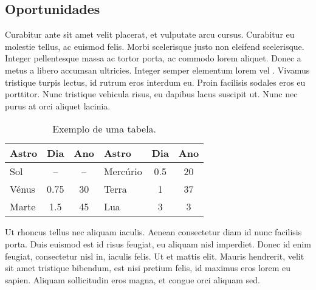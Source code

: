 \subsection{Oportunidades}

Curabitur  ante sit amet velit placerat, et vulputate arcu cursus. Curabitur eu molestie tellus, ac euismod felis. Morbi scelerisque justo non eleifend scelerisque. Integer pellentesque massa ac tortor porta, ac commodo lorem aliquet. Donec a metus a libero accumsan ultricies. Integer semper elementum lorem vel . Vivamus tristique turpis lectus, id rutrum eros interdum eu. Proin facilisis sodales eros eu porttitor. Nunc tristique vehicula risus, eu dapibus lacus suscipit ut. Nunc nec purus at orci aliquet lacinia.

\begin{table}
	\caption{Exemplo de uma tabela.}
	\begin{center}
		\begin{tabular}{lcc|lcc}
			\textbf{Astro} & \textbf{Dia} & \textbf{Ano} & \textbf{Astro} & \textbf{Dia} & \textbf{Ano}\\
			\hline
			Sol & -- & -- & Mercúrio  & 0.5 & 20 \\
			Vénus & 0.75 & 30 & Terra & 1 & 37 \\
			Marte & 1.5 & 45 & Lua & 3 & 3 
		\end{tabular}
	\end{center}
\end{table}

Ut rhoncus tellus nec aliquam iaculis. Aenean consectetur diam id nunc facilisis porta. Duis euismod est id risus feugiat, eu aliquam nisl imperdiet. Donec id enim feugiat, consectetur nisl in, iaculis felis. Ut et mattis elit. Mauris hendrerit, velit sit amet tristique bibendum, est nisi pretium felis, id maximus eros lorem eu sapien. Aliquam sollicitudin eros magna, et congue orci aliquam sed. 
